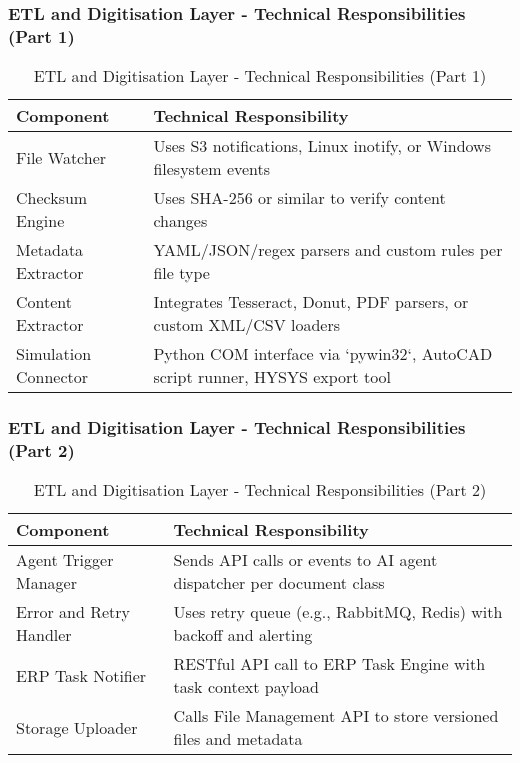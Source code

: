 \begin{frame}
    \frametitle{ETL and Digitisation Layer - Technical Responsibilities (Part 1)}
    \begin{table}[h!]
\centering
\renewcommand{\arraystretch}{1.2}
\begin{tabular}{|p{3cm}|p{7cm}|}
\hline
\textbf{Component} & \textbf{Technical Responsibility} \\
\hline
File Watcher & Uses S3 notifications, Linux inotify, or Windows filesystem events \\
\hline
Checksum Engine & Uses SHA-256 or similar to verify content changes \\
\hline
Metadata Extractor & YAML/JSON/regex parsers and custom rules per file type \\
\hline
Content Extractor & Integrates Tesseract, Donut, PDF parsers, or custom XML/CSV loaders \\
\hline
Simulation Connector & Python COM interface via `pywin32`, AutoCAD script runner, HYSYS export tool \\
\hline
\end{tabular}
\caption{ETL and Digitisation Layer - Technical Responsibilities (Part 1)}
\end{table}
\end{frame}

\begin{frame}
    \frametitle{ETL and Digitisation Layer - Technical Responsibilities (Part 2)}
    \begin{table}[h!]
\centering
\renewcommand{\arraystretch}{1.2}
\begin{tabular}{|p{3cm}|p{7cm}|}
\hline
\textbf{Component} & \textbf{Technical Responsibility} \\
\hline
Agent Trigger Manager & Sends API calls or events to AI agent dispatcher per document class \\
\hline
Error and Retry Handler & Uses retry queue (e.g., RabbitMQ, Redis) with backoff and alerting \\
\hline
ERP Task Notifier & RESTful API call to ERP Task Engine with task context payload \\
\hline
Storage Uploader & Calls File Management API to store versioned files and metadata \\
\hline
\end{tabular}
\caption{ETL and Digitisation Layer - Technical Responsibilities (Part 2)}
\end{table}
\end{frame}